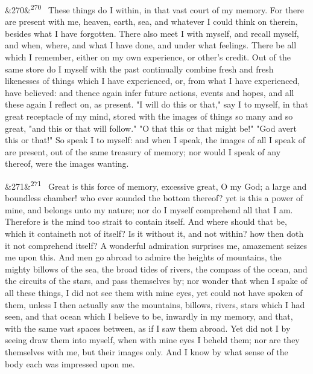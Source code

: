 \documentclass[12pt]{article}
\newcommand{\para}[1][]{\par\noindent\ifx&#1&\else\textsuperscript{\footnotesize #1}~\fi}
\begin{document}
\para[270] These things do I within, in that vast court of my memory. For there are present with me, heaven, earth, sea, and whatever I could think on therein, besides what I have forgotten. There also meet I with myself, and recall myself, and when, where, and what I have done, and under what feelings. There be all which I remember, either on my own experience, or other's credit. Out of the same store do I myself with the past continually combine fresh and fresh likenesses of things which I have experienced, or, from what I have experienced, have believed: and thence again infer future actions, events and hopes, and all these again I reflect on, as present. "I will do this or that," say I to myself, in that great receptacle of my mind, stored with the images of things so many and so great, "and this or that will follow." "O that this or that might be!" "God avert this or that!" So speak I to myself: and when I speak, the images of all I speak of are present, out of the same treasury of memory; nor would I speak of any thereof, were the images wanting.

\para[271] Great is this force of memory, excessive great, O my God; a large and boundless chamber! who ever sounded the bottom thereof? yet is this a power of mine, and belongs unto my nature; nor do I myself comprehend all that I am. Therefore is the mind too strait to contain itself. And where should that be, which it containeth not of itself? Is it without it, and not within? how then doth it not comprehend itself? A wonderful admiration surprises me, amazement seizes me upon this. And men go abroad to admire the heights of mountains, the mighty billows of the sea, the broad tides of rivers, the compass of the ocean, and the circuits of the stars, and pass themselves by; nor wonder that when I spake of all these things, I did not see them with mine eyes, yet could not have spoken of them, unless I then actually saw the mountains, billows, rivers, stars which I had seen, and that ocean which I believe to be, inwardly in my memory, and that, with the same vast spaces between, as if I saw them abroad. Yet did not I by seeing draw them into myself, when with mine eyes I beheld them; nor are they themselves with me, but their images only. And I know by what sense of the body each was impressed upon me.
\end{document}
